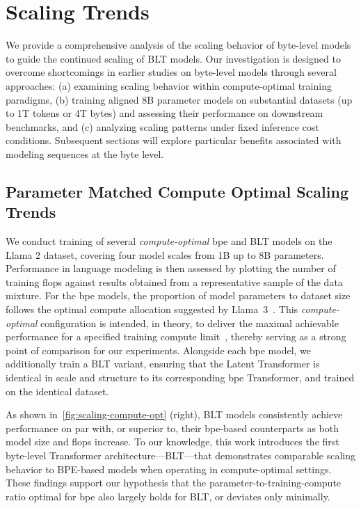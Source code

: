 \section{Scaling Trends}
\label{section:scaling}

We provide a comprehensive analysis of the scaling behavior of byte-level models to guide the continued scaling of {\textsc BLT} models. Our investigation is designed to overcome shortcomings in earlier studies on byte-level models through several approaches: (a) examining scaling behavior within compute-optimal training paradigms, (b) training aligned 8B parameter models on substantial datasets (up to 1T tokens or 4T bytes) and assessing their performance on downstream benchmarks, and (c) analyzing scaling patterns under fixed inference cost conditions. Subsequent sections will explore particular benefits associated with modeling sequences at the byte level.

\subsection{Parameter Matched Compute Optimal Scaling Trends}
\label{section:parameter-matched-scaling}
We conduct training of several \textit{compute-optimal} bpe and {\textsc BLT} models on the Llama 2 dataset, covering four model scales from 1B up to 8B parameters. Performance in language modeling is then assessed by plotting the number of training flops against results obtained from a representative sample of the data mixture. For the bpe models, the proportion of model parameters to dataset size follows the optimal compute allocation suggested by Llama~3~\citep{dubey2024llama}. This \textit{compute-optimal} configuration is intended, in theory, to deliver the maximal achievable performance for a specified training compute limit~\citep{hoffmann2022training}, thereby serving as a strong point of comparison for our experiments. Alongside each bpe model, we additionally train a {\textsc BLT} variant, ensuring that the Latent Transformer is identical in scale and structure to its corresponding bpe Transformer, and trained on the identical dataset.

As shown in~\autoref{fig:scaling-compute-opt} (right), {\textsc BLT} models consistently achieve performance on par with, or superior to, their bpe-based counterparts as both model size and flops increase. To our knowledge, this work introduces the first byte-level Transformer architecture—{\textsc BLT}—that demonstrates comparable scaling behavior to BPE-based models when operating in compute-optimal settings. These findings support our hypothesis that the parameter-to-training-compute ratio optimal for bpe also largely holds for {\textsc BLT}, or deviates only minimally.

